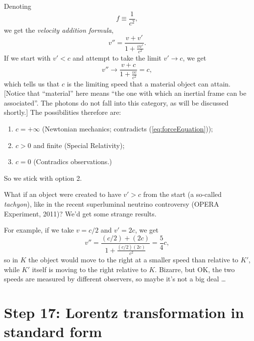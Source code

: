 \documentclass[twocolumn,preprintnumbers,amsmath,amssymb,final]{revtex4}
\def\BEq{\begin{equation}}
\def\EEq{\end{equation}}
\begin{document}
\noindent Denoting
\BEq
f \equiv \frac{1}{c^2},
\EEq
we get the {\it velocity addition formula},
\BEq
\label{eq:103}
v''=\frac{v+v'}{1+\frac{vv'}{c^2}}.
\EEq
 If we start with $v'<c$ and attempt to take the limit $v'\rightarrow c$, we get
\BEq
\label{eq:104}
v''\rightarrow\frac{v+c}{1+\frac{vc}{c^2}}=c,
\EEq
which tells us that $c$ is the limiting speed that a material object can attain. 
[Notice that ``material'' here means  ``the one with which an inertial frame can be associated''. The photons do not fall into this category, as will be discussed shortly.]
The possibilities therefore are:
\begin{enumerate}
\item $c=+\infty$ (Newtonian mechanics; contradicts (\ref{eq:forceEquation}));
\item $c>0$ and finite (Special Relativity);
\item $c = 0$ (Contradics observations.)
\end{enumerate} 

So we stick with option 2.

What if an object were created to have $v'>c$ from the start (a so-called {\it tachyon}), 
like in the recent superluminal neutrino controversy (OPERA Experiment, 2011)? 
We'd get some strange results.

For example, if we take $v=c/2$ and $v' = 2c$, we get
\BEq
\label{eq:105}
v''=\frac{(c/2)+(2c)}{1+\frac{(c/2)(2c)}{c^2}}= \frac{5}{4}c,
\EEq
so in $K$ the object would move to the right at a smaller speed than relative to $K'$, while
$K'$ itself is moving to the right relative to $K$. 
Bizarre, but OK, the two speeds are measured by different 
observers, so maybe it's not a big deal \dots 



\section*{Step 17: Lorentz transformation in standard form}
\end{document}
